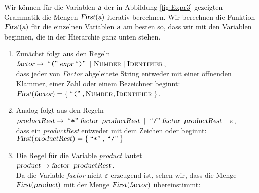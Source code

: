 \example
Wir k\"onnen f\"ur die Variablen $\textsl{a}$ der in Abbildung \ref{fig:Expr3} gezeigten Grammatik 
die Mengen $\textsl{First}(\textsl{a})$ iterativ berechnen.  Wir berechnen
die Funktion $\textsl{First}(\textsl{a})$ f\"ur die einzelnen Variablen $\textsl{a}$ am besten so, dass wir mit den
Variablen beginnen, die in der Hierarchie ganz unten stehen. 
\begin{enumerate}
\item Zun\"achst folgt aus den Regeln
      \\[0.2cm]
      \hspace*{1.3cm}
      $\textsl{factor} \rightarrow \;\mbox{``\texttt{(}''}\; \textsl{expr} \;\mbox{``\texttt{)}''}\; \mid \textsc{Number} \mid \textsc{Identifier}$,
      \\[0.2cm]
      dass jeder von \textsl{Factor} abgeleitete String entweder mit einer \"offnenden
      Klammer, einer Zahl oder einem Bezeichner beginnt:
      \\[0.2cm]
      \hspace*{1.3cm}
      $\textsl{First}(\textsl{factor}) = \{ \;\mbox{``\texttt{(}''}\;, \textsc{Number}, \textsc{Identifier}\; \}$.
\item Analog folgt aus den Regeln 
      \\[0.2cm]
      \hspace*{1.3cm}
      $\textsl{productRest} \rightarrow \;\mbox{``\texttt{*}''}\; \textsl{factor}\;\;\textsl{productRest} \;
                            \mid        \;\mbox{``\texttt{/}''}\; \textsl{factor}\;\;\textsl{productRest} \;
                            \mid        \varepsilon$,
      \\[0.2cm]
      dass ein \textsl{productRest} entweder mit dem Zeichen \qote{*} oder \qote{/} beginnt:
      \\[0.2cm]
      \hspace*{1.3cm}
      $\textsl{First}(\textsl{productRest}) = \{ \;\mbox{``\texttt{*}''}\;, \;\mbox{``\texttt{/}''}\; \}$
\item Die Regel f\"ur die Variable \textsl{product} lautet
      \\[0.2cm]
      \hspace*{1.3cm}
      $\textsl{product} \rightarrow \textsl{factor}\;\;\textsl{productRest}$.
      \\[0.2cm]
      Da die Variable \textsl{factor} nicht $\varepsilon$ erzeugend ist, sehen wir, dass
      die Menge $\textsl{First}(\textsl{product})$ mit der Menge
      $\textsl{First}(\textsl{factor})$ \"ubereinstimmt:
      \\[0.2cm]
      \hspace*{1.3cm}

\end{enumerate}
